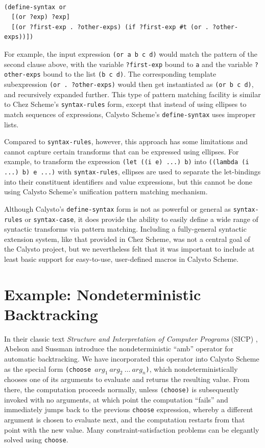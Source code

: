 \documentclass[acmsmall,screen,authorversion]{acmart}
\begin{document}
\begin{minipage}{\textwidth}
\begin{verbatim}

(define-syntax or
  [(or ?exp) ?exp]
  [(or ?first-exp . ?other-exps) (if ?first-exp #t (or . ?other-exps))])

\end{verbatim}
\end{minipage}

\noindent
For example, the input expression \texttt{(or a b c d)} would match the pattern
of the second clause above, with the variable \texttt{?first-exp} bound to
\texttt{a} and the variable \texttt{?other-exps} bound to the list
\texttt{(b~c~d)}. The corresponding template subexpression
\texttt{(or~.~?other-exps)} would then get instantiated as \texttt{(or~b~c~d)},
and recursively expanded further. This type of pattern matching facility is
similar to Chez Scheme's \texttt{syntax-rules} form, except that instead of
using ellipses to match sequences of expressions, Calysto Scheme's
\texttt{define-syntax} uses improper lists.

Compared to \texttt{syntax-rules}, however, this approach has some limitations
and cannot capture certain transforms that can be expressed using ellipses.
For example, to transform the expression \texttt{(let ((i e) ...) b)} into
\texttt{((lambda (i ...) b) e ...)} with \texttt{syntax-rules}, ellipses are
used to separate the let-bindings into their constituent identifiers and value
expressions, but this cannot be done using Calysto Scheme's unification pattern
matching mechanism.

Although Calysto's \texttt{define-syntax} form is not as powerful or general as
\texttt{syntax-rules} or \texttt{syntax-case}, it does provide the ability to
easily define a wide range of syntactic transforms via pattern matching.
Including a fully-general syntactic extension system, like that provided in
Chez Scheme, was not a central goal of the Calysto project, but we nevertheless
felt that it was important to include at least basic support for easy-to-use,
user-defined macros in Calysto Scheme.

\section{Example: Nondeterministic Backtracking}

\noindent
In their classic text \emph{Structure and Interpretation of Computer Programs}
(SICP) \cite{SICP}, Abelson and Sussman introduce the nondeterministic ``amb''
operator for automatic backtracking.  We have incorporated this operator into
Calysto Scheme as the special form
\texttt{(choose~$\mathit{arg}_1~\mathit{arg}_2~\ldots~\mathit{arg}_n$)}, which
nondeterministically chooses one of its arguments to evaluate and returns the
resulting value.  From there, the computation proceeds normally, unless
\texttt{(choose)} is subsequently invoked with no arguments, at which point the
computation ``fails'' and immediately jumps back to the previous
\texttt{choose} expression, whereby a different argument is chosen to evaluate
next, and the computation restarts from that point with the new value.  Many
constraint-satisfaction problems can be elegantly solved using \texttt{choose}.
\end{document}
